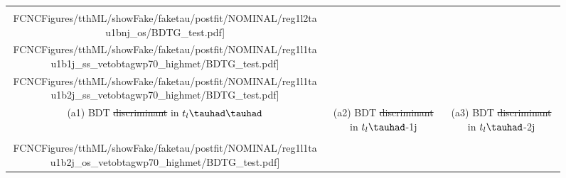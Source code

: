 \documentclass[PAPER, coverpage, atlasdraft=true, texlive=2016, UKenglish]{\ATLASLATEXPATH atlasdoc}
\providecommand{\DIFdel}[1]{{\protect\color{red}\sout{#1}}}                      %
\providecommand{\DIFdelFL}[1]{\DIFdel{#1}} %
\providecommand{\DIFdelbeginFL}{} %
\providecommand{\DIFdelendFL}{} %
\begin{document}
\begin{figure}[H]
\centering
\begin{tabular}{@{}ccc@{}}
  \texttt{[image: \\FCNCFigures/tthML/showFake/faketau/postfit/NOMINAL/reg1l2tau1bnj\_os/BDTG\_test.pdf]}&
  \texttt{[image: \\FCNCFigures/tthML/showFake/faketau/postfit/NOMINAL/reg1l1tau1b1j\_ss\_vetobtagwp70\_highmet/BDTG\_test.pdf]}&
  \texttt{[image: \\FCNCFigures/tthML/showFake/faketau/postfit/NOMINAL/reg1l1tau1b2j\_ss\_vetobtagwp70\_highmet/BDTG\_test.pdf]}\\
(a1) BDT \DIFdelbeginFL \DIFdelFL{discriminant }\DIFdelendFL in $t_l\thadhad$ & (a2) BDT \DIFdelbeginFL \DIFdelFL{discriminant }\DIFdelendFL in  $t_l\tauhad$-1j& (a3) BDT \DIFdelbeginFL \DIFdelFL{discriminant }\DIFdelendFL in $t_l\tauhad$-2j\\
  \texttt{[image: \\FCNCFigures/tthML/showFake/faketau/postfit/NOMINAL/reg1l1tau1b2j\_os\_vetobtagwp70\_highmet/BDTG\_test.pdf]}&

\end{tabular}
\end{figure}
\end{document}
